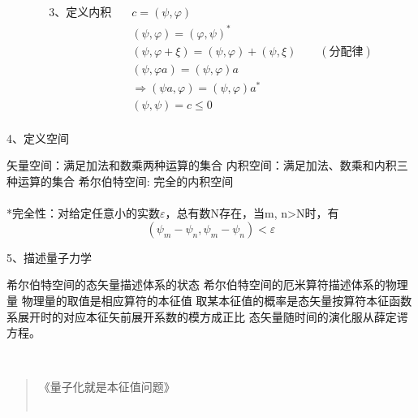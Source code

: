 \begin{frame} 
    \begin{equation*}
        \begin{split}
            \text{3、定义内积} \quad &c=(\psi, \varphi)\\
            &(\psi, \varphi)= (\varphi,\psi)^* \\
            &(\psi, \varphi+\xi)= (\psi, \varphi) + (\psi, \xi)\qquad (\text{分配律})\\
            &(\psi, \varphi a)= (\psi, \varphi )a \\
            &\Rightarrow (\psi a, \varphi )= (\psi, \varphi )a^* \\
            &(\psi,\psi)= c\le 0\\
        \end{split}  
    \end{equation*}
\end{frame} 

\begin{frame}
    4、定义空间\\
   \begin{itemize}
       \Item 矢量空间：满足加法和数乘两种运算的集合
       \Item 内积空间：满足加法、数乘和内积三种运算的集合
       \Item 希尔伯特空间:  完全的内积空间\\
       ~~ \\
       *完全性：对给定任意小的实数$\varepsilon$，总有数N存在，当m, n>N时，有\\
       $$ (\psi_m -\psi_n, \psi_m -\psi_n )< \varepsilon $$
   \end{itemize} 
\end{frame} 

\begin{frame}
   5、描述量子力学\\
   \begin{itemize}
       \Item 希尔伯特空间的态矢量描述体系的状态
       \Item 希尔伯特空间的厄米算符描述体系的物理量
       \Item 物理量的取值是相应算符的本征值
       \Item 取某本征值的概率是态矢量按算符本征函数系展开时的对应本征矢前展开系数的模方成正比
       \Item 态矢量随时间的演化服从薛定谔方程。
   \end{itemize}
   ~~ \\ \vspace{1.0em}
   \begin{quote}
    《量子化就是本征值问题》\\
    ~~\\
 \end{quote}
\end{frame} 


